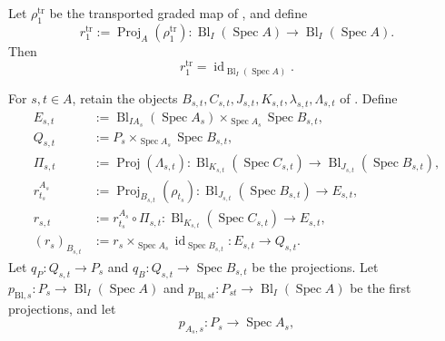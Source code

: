 \begin{lemma}
  \label{lemma:nagata-affine-blowup-restrict-cocycle}

  Let $\rho_1^{\mathrm{tr}}$ be the transported graded map of
  , and define
  \[
    r_1^{\mathrm{tr}}
      :=\operatorname{Proj}_A(\rho_1^{\mathrm{tr}})
      \colon\operatorname{Bl}_I(\operatorname{Spec}A)
      \longrightarrow\operatorname{Bl}_I(\operatorname{Spec}A).
  \]
  Then
  \[
    r_1^{\mathrm{tr}}
      =\operatorname{id}_{\operatorname{Bl}_I(\operatorname{Spec}A)}.
  \]

  For $s,t\in A$, retain the objects
  $B_{s,t},C_{s,t},J_{s,t},K_{s,t},\lambda_{s,t},
  \Lambda_{s,t}$ of .  Define
  \[
  \begin{aligned}
    E_{s,t}
      &:=\operatorname{Bl}_{IA_s}(\operatorname{Spec}A_s)
        \times_{\operatorname{Spec}A_s}\operatorname{Spec}B_{s,t},\\
    Q_{s,t}
      &:=P_s\times_{\operatorname{Spec}A_s}\operatorname{Spec}B_{s,t},\\
    \Pi_{s,t}
      &:=\operatorname{Proj}(\Lambda_{s,t})
        \colon
        \operatorname{Bl}_{K_{s,t}}(\operatorname{Spec}C_{s,t})
        \longrightarrow
        \operatorname{Bl}_{J_{s,t}}(\operatorname{Spec}B_{s,t}),\\
    r_{t_s}^{A_s}
      &:=\operatorname{Proj}_{B_{s,t}}(\rho_{t_s})
        \colon
        \operatorname{Bl}_{J_{s,t}}(\operatorname{Spec}B_{s,t})
        \longrightarrow E_{s,t},\\
    r_{s,t}&:=r_{t_s}^{A_s}\circ\Pi_{s,t}
        \colon
        \operatorname{Bl}_{K_{s,t}}(\operatorname{Spec}C_{s,t})
        \longrightarrow E_{s,t},\\
    (r_s)_{B_{s,t}}
      &:=r_s\times_{\operatorname{Spec}A_s}
        \operatorname{id}_{\operatorname{Spec}B_{s,t}}
        \colon E_{s,t}\longrightarrow Q_{s,t}.
  \end{aligned}
  \]
  Let $q_P\colon Q_{s,t}\to P_s$ and
  $q_B\colon Q_{s,t}\to\operatorname{Spec}B_{s,t}$ be the projections.
  Let $p_{\mathrm{Bl},s}\colon P_s\to
  \operatorname{Bl}_I(\operatorname{Spec}A)$ and
  $p_{\mathrm{Bl},st}\colon P_{st}\to
  \operatorname{Bl}_I(\operatorname{Spec}A)$ be the first projections, and
  let
  \[
    p_{A_s,s}\colon P_s\to\operatorname{Spec}A_s,
\]
\end{lemma}
